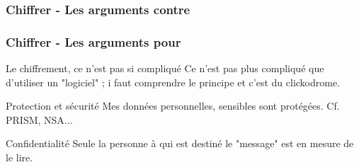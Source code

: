 \documentclass{beamer}
\begin{document}
\begin{frame}
\frametitle{Chiffrer - Les arguments contre}

\end{frame}

\begin{frame}
\frametitle{Chiffrer - Les arguments pour}

\begin{block}{Le chiffrement, ce n'est pas si compliqué}
Ce n'est pas plus compliqué que d'utiliser un "logiciel" ; i faut comprendre le principe et c'est du clickodrome.
\end{block}

\begin{block}{Protection et sécurité}
Mes données personnelles, sensibles sont protégées. Cf. PRISM, NSA...
\end{block}

\begin{block}{Confidentialité}
Seule la personne à qui est destiné le "message" est en mesure de le lire.
\end{block}

\end{frame}
\end{document}
